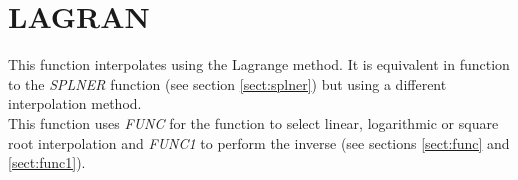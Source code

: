 \section{LAGRAN}
\label{sect:lagran}

\noindent This function interpolates using the Lagrange method. It is
equivalent in function to the {\em SPLNER} function (see section
\ref{sect:splner}) but using a different interpolation method.\\

\noindent This function uses {\em FUNC} for the function to select linear,
logarithmic or square root interpolation and {\em FUNC1} to perform the
inverse (see sections \ref{sect:func} and \ref{sect:func1}).\\

